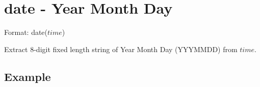 
%

\section{date - Year Month Day\label{sect:date}}

Format: date($time$)

Extract 8-digit fixed length string of Year Month Day (YYYMMDD) from $time$. 

\subsection*{Example}


%

